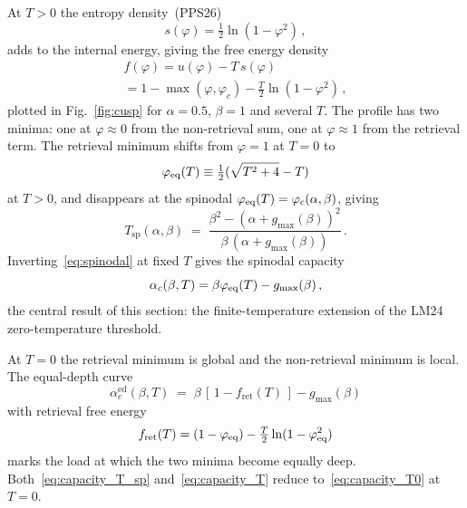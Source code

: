 \documentclass[letterpaper]{article} %
\newcommand{\Bnet}{\beta}
\newcommand{\fret}{f_{\mathrm{ret}}}
\newcommand{\gmax}{g_{\max}}
\newcommand{\ac}{\alpha_c}
\newcommand{\acEd}{\alpha_c^{\mathrm{ed}}}
\begin{document}
At $T > 0$ the entropy density~(PPS26)
\begin{equation}
    s(\varphi) = \tfrac{1}{2} \ln(1 - \varphi^2)\,,
    \label{eq:entropy}
\end{equation}
adds to the internal energy, giving the free energy density 
\begin{multline}
    f(\varphi) = u(\varphi) - T\,s(\varphi) \\= 1 -\max(\varphi, \varphi_c) - \tfrac{T}{2}\ln(1-\varphi^2)\,,
    \label{eq:free_en}
\end{multline}
plotted in  Fig.~\ref{fig:cusp} for $\alpha = 0.5$, $\Bnet = 1$ and several $T$. The profile has two minima: one at $\varphi \approx 0$ from the non-retrieval sum, one at $\varphi \approx 1$ from the retrieval term. The retrieval minimum shifts from $\varphi = 1$ at $T = 0$ to
\begin{equation}
    \varphi_{\rm eq}(T) \equiv \tfrac{1}{2}(\sqrt{T^2 + 4} - T)
    \label{eq:phi_eq}
\end{equation}
at $T > 0$, and disappears at the spinodal
$\varphi_{\rm eq}(T) = \varphi_c(\alpha, \Bnet)$, giving
\begin{equation}
    T_{\mathrm{sp}}(\alpha, \Bnet) \;=\; \frac{\Bnet^2 - (\alpha + \gmax(\Bnet))^2}
              {\Bnet\,(\alpha + \gmax(\Bnet))}\,.
    \label{eq:spinodal}
\end{equation}
Inverting~\eqref{eq:spinodal} at fixed $T$ gives the spinodal capacity
\begin{equation}
    \ac(\Bnet, T) = \Bnet \varphi_{\rm eq}(T) - g_{\max}(\Bnet)\,,
    \label{eq:capacity_T_sp}
\end{equation}
the central result of this section: the finite-temperature extension of the LM24 zero-temperature threshold.

At $T = 0$ the retrieval minimum is global and the non-retrieval minimum is local. The equal-depth curve
\begin{equation}
    \acEd(\Bnet, T) \;=\; \Bnet\,[\,1 - \fret(T)\,] - g_{\max}(\Bnet)
    \label{eq:capacity_T}
\end{equation}
with retrieval free energy
\begin{equation}
    \fret(T) = (1 - \varphi_{\rm eq}) - \tfrac{T}{2}\ln(1 - \varphi_{\rm eq}^2)
\end{equation}
marks the load at which the two minima become equally deep. Both~\eqref{eq:capacity_T_sp} and~\eqref{eq:capacity_T} reduce to~\eqref{eq:capacity_T0} at $T = 0$.

\end{document}
